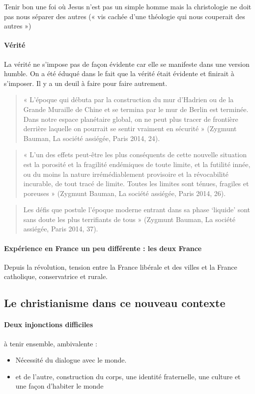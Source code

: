 Tenir bon une foi où Jesus n’est pas un simple homme mais la christologie ne doit pas nous séparer des autres (« vis cachée d’une théologie qui nous couperait des autres »)

\paragraph{Vérité}
La vérité ne s’impose pas de façon évidente car elle se manifeste dans une version humble. On a été éduqué dans le fait que la vérité était évidente et finirait à s’imposer. Il y a un deuil à faire pour faire autrement. 

\begin{quote}
    « L’époque qui débuta par la construction du mur d’Hadrien ou de la Grande Muraille de Chine et se
termina par le mur de Berlin est terminée. Dans notre espace planétaire global, on ne peut plus tracer
de frontière derrière laquelle on pourrait se sentir vraiment en sécurité » (Zygmunt Bauman, La société
assiégée, Paris 2014, 24).
\end{quote}

\begin{quote}
    « L’un des effets peut-être les plus conséquents de cette nouvelle situation est la porosité et la fragilité
endémiques de toute limite, et la futilité innée, ou du moins la nature irrémédiablement provisoire et la
révocabilité incurable, de tout tracé de limite. Toutes les limites sont ténues, fragiles et poreuses »
(Zygmunt Bauman, La société assiégée, Paris 2014, 26).
\end{quote}

\begin{quote}
    Les défis que postule l’époque moderne entrant dans sa phase ‘liquide’ sont sans doute les plus
terrifiants de tous » (Zygmunt Bauman, La société assiégée, Paris 2014, 37).
\end{quote}

\paragraph{Expérience en France un peu différente : les deux France} Depuis la révolution, tension entre la France libérale et des villes et la France catholique, conservatrice et rurale.


\subsection{Le christianisme dans ce nouveau contexte}
\paragraph{Deux injonctions difficiles} à tenir ensemble, ambivalente : 
\begin{itemize}
    \item Nécessité du dialogue avec le monde. 
    \item et de l'autre, construction du corps, une identité fraternelle, une culture et une façon d'habiter le monde
\end{itemize}


